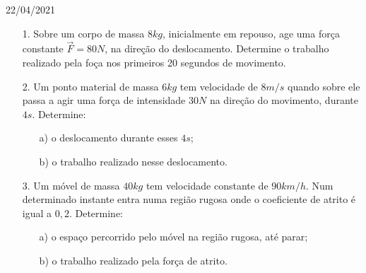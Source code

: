 \documentclass{SchoolBook}
\begin{document}
    \begin{day}{22/04/2021}
        \begin{enumerate}
            \item[1.] Sobre um corpo de massa $ 8 kg $, inicialmente em repouso, age uma força constante $ \vec{F} = 80 N $, na direção do deslocamento.
            Determine o trabalho realizado pela foça nos primeiros 20 segundos de movimento.

            \item[2.] Um ponto material de massa $ 6 kg $ tem velocidade de $ 8 m/s $ quando sobre ele passa a agir uma força de intensidade $ 30 N $ na direção do movimento, durante $ 4 s $. Determine:
            \begin{enumerate}
                \item[a)] o deslocamento durante esses $ 4 s$;
                \item[b)] o trabalho realizado nesse deslocamento.
            \end{enumerate}

            \item[3.] Um móvel de massa $ 40 kg $ tem velocidade constante de $ 90 km/h $.
            Num determinado instante entra numa região rugosa onde o coeficiente de atrito é igual a $ 0,2 $. Determine:
            \begin{enumerate}
                \item[a)] o espaço percorrido pelo móvel na região rugosa, até parar;
                \item[b)] o trabalho realizado pela força de atrito.
            \end{enumerate}
        \end{enumerate}
    \end{day}
\end{document}
